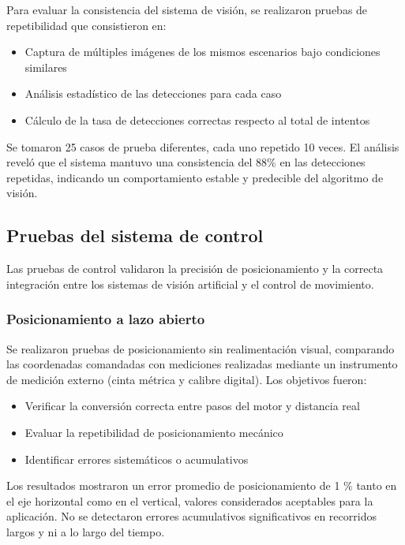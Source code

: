Para evaluar la consistencia del sistema de visión, se realizaron pruebas de repetibilidad que consistieron en:

\begin{itemize}
    \item Captura de múltiples imágenes de los mismos escenarios bajo condiciones similares
    \item Análisis estadístico de las detecciones para cada caso
    \item Cálculo de la tasa de detecciones correctas respecto al total de intentos
\end{itemize}

Se tomaron 25 casos de prueba diferentes, cada uno repetido 10 veces. El análisis reveló que el sistema mantuvo una consistencia del 88\% en las detecciones repetidas, indicando un comportamiento estable y predecible del algoritmo de visión.

\subsection{Pruebas del sistema de control}

Las pruebas de control validaron la precisión de posicionamiento y la correcta integración entre los sistemas de visión artificial y el control de movimiento.

\subsubsection{Posicionamiento a lazo abierto}

Se realizaron pruebas de posicionamiento sin realimentación visual, comparando las coordenadas comandadas con mediciones realizadas mediante un instrumento de medición externo (cinta métrica y calibre digital). Los objetivos fueron:

\begin{itemize}
    \item Verificar la conversión correcta entre pasos del motor y distancia real
    \item Evaluar la repetibilidad de posicionamiento mecánico
    \item Identificar errores sistemáticos o acumulativos
\end{itemize}

Los resultados mostraron un error promedio de posicionamiento de 1 $\%$ tanto en el eje horizontal como en el vertical, valores considerados aceptables para la aplicación. No se detectaron errores acumulativos significativos en recorridos largos y ni a lo largo del tiempo.

